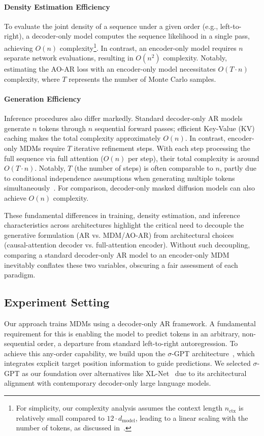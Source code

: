 \paragraph{Density Estimation Efficiency} To evaluate the joint density of a sequence under a given order (e.g., left-to-right), a decoder-only model computes the sequence likelihood in a single pass, achieving $O(n)$ complexity\footnote{For simplicity, our complexity analysis assumes the context length $n_{\text{ctx}}$ is relatively small compared to $12\cdot d_{\text{model}}$, leading to a linear scaling with the number of tokens, as discussed in~\cite{kaplan2020scaling}.}. In contrast, an encoder-only model requires $n$ separate network evaluations, resulting in $O(n^2)$ complexity. Notably, estimating the AO-AR loss with an encoder-only model necessitates $O(T\cdot n)$ complexity, where $T$ represents the number of Monte Carlo samples.
\paragraph{Generation Efficiency} Inference procedures also differ markedly. Standard decoder-only AR models generate $n$ tokens through $n$ sequential forward passes; efficient Key-Value (KV) caching makes the total complexity approximately $O(n)$. In contrast, encoder-only MDMs require $T$ iterative refinement steps. With each step processing the full sequence via full attention ($O(n)$ per step), their total complexity is around $O(T\cdot n)$. Notably, $T$ (the number of steps) is often comparable to $n$, partly due to conditional independence assumptions when generating multiple tokens simultaneously~\cite{liu2024discrete,xu2024energy}. For comparison, decoder-only masked diffusion models can also achieve $O(n)$ complexity.

These fundamental differences in training, density estimation, and inference characteristics across architectures highlight the critical need to decouple the generative formulation (AR vs. MDM/AO-AR) from architectural choices (causal-attention decoder vs. full-attention encoder). Without such decoupling, comparing a standard decoder-only AR model to an encoder-only MDM inevitably conflates these two variables, obscuring a fair assessment of each paradigm.

\subsection{Experiment Setting}

Our approach trains MDMs using a decoder-only AR framework. A fundamental requirement for this is enabling the model to predict tokens in an arbitrary, non-sequential order, a departure from standard left-to-right autoregression. To achieve this any-order capability, we build upon the $\sigma$-GPT architecture~\cite{pannatier2024sigma}, which integrates explicit target position information to guide predictions. We selected $\sigma$-GPT as our foundation over alternatives like XL-Net~\cite{yang2019xlnet} due to its architectural alignment with contemporary decoder-only large language models.


